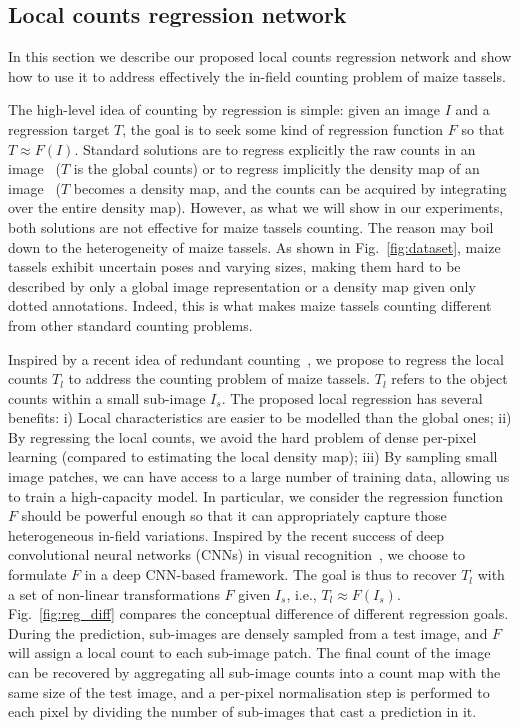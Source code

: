 \documentclass[twocolumn]{bmcart}%
\begin{document}
\subsection*{Local counts regression network}
In this section we describe our proposed local counts regression network and show how to use it to address effectively the in-field counting problem of maize tassels.

The high-level idea of counting by regression is simple: given an image $I$ and a regression target $T$, the goal is to seek some kind of regression function $F$ so that $T\approx F(I)$. Standard solutions are to regress explicitly the raw counts in an image~\cite{chan2008privacy} ($T$ is the global counts) or to regress implicitly the density map of an image~\cite{vlaz2010denlearn} ($T$ becomes a density map, and the counts can be acquired by integrating over the entire density map). However, as what we will show in our experiments, both solutions are not effective for maize tassels counting. The reason may boil down to the heterogeneity of maize tassels. As shown in Fig.~\ref{fig:dataset}, maize tassels exhibit uncertain poses and varying sizes, making them hard to be described by only a global image representation or a density map given only dotted annotations. Indeed, this is what makes maize tassels counting different from other standard counting problems.

Inspired by a recent idea of redundant counting~\cite{cohen2017count}, we propose to regress the local counts $T_l$ to address the counting problem of maize tassels. $T_l$ refers to the object counts within a small sub-image $I_s$. The proposed local regression has several benefits: i) Local characteristics are easier to be modelled than the global ones; ii) By regressing the local counts, we avoid the hard problem of dense per-pixel learning (compared to estimating the local density map); iii) By sampling small image patches, we can have access to a large number of training data, allowing us to train a high-capacity model. In particular, we consider the regression function $F$ should be powerful enough so that it can appropriately capture those heterogeneous in-field variations. Inspired by the recent success of deep convolutional neural networks (CNNs) in visual recognition~\cite{Krizhevsky2012,Simonyan14verydeep}, we choose to formulate $F$ in a deep CNN-based framework. The goal is thus to recover $T_l$ with a set of non-linear transformations $F$ given $I_s$, i.e., $T_l\approx F(I_s)$. Fig.~\ref{fig:reg_diff} compares the conceptual difference of different regression goals. During the prediction, sub-images are densely sampled from a test image, and $F$ will assign a local count to each sub-image patch. The final count of the image can be recovered by aggregating all sub-image counts into a count map with the same size of the test image, and a per-pixel normalisation step is performed to each pixel by dividing the number of sub-images that cast a prediction in it.
\end{document}
